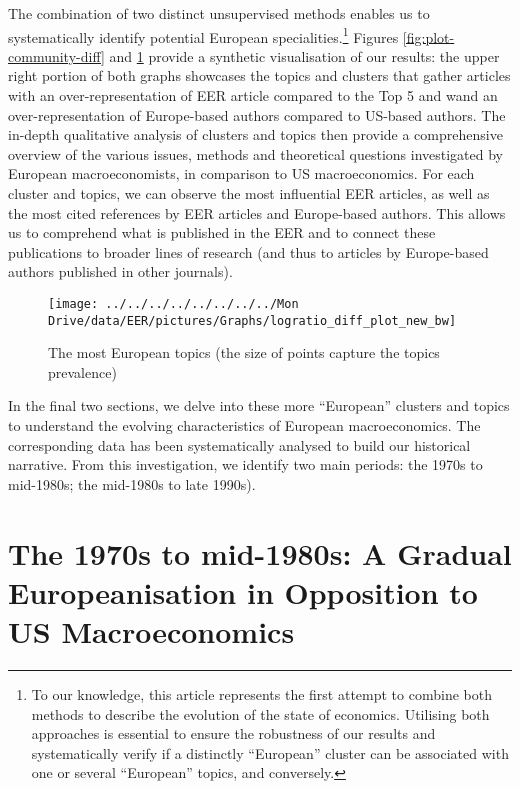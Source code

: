 \documentclass[
  12pt,
  onecolumn]{article}
\begin{document}
The combination of two distinct unsupervised methods enables us to systematically identify potential European specialities.\footnote{To our knowledge, this article represents the first attempt to combine both methods to describe the evolution of the state of economics. Utilising both approaches is essential to ensure the robustness of our results and systematically verify if a distinctly ``European'' cluster can be associated with one or several ``European'' topics, and conversely.} Figures \ref{fig:plot-community-diff} and \ref{fig:plot-topic-diff} provide a synthetic visualisation of our results: the upper right portion of both graphs showcases the topics and clusters that gather articles with an over-representation of EER article compared to the Top 5 and wand an over-representation of Europe-based authors compared to US-based authors. The in-depth qualitative analysis of clusters and topics then provide a comprehensive overview of the various issues, methods and theoretical questions investigated by European macroeconomists, in comparison to US macroeconomics. For each cluster and topics, we can observe the most influential EER articles, as well as the most cited references by EER articles and Europe-based authors. This allows us to comprehend what is published in the EER and to connect these publications to broader lines of research (and thus to articles by Europe-based authors published in other journals).

\begin{figure}[H]

{\centering \texttt{[image: ../../../../../../../../Mon Drive/data/EER/pictures/Graphs/logratio\_diff\_plot\_new\_bw]} 

}

\caption{The most European topics (the size of points capture the topics prevalence)}\label{fig:plot-topic-diff}
\end{figure}

\bigskip

In the final two sections, we delve into these more ``European'' clusters and topics to understand the evolving characteristics of European macroeconomics. The corresponding data has been systematically analysed to build our historical narrative. From this investigation, we identify two main periods: the 1970s to mid-1980s; the mid-1980s to late 1990s).

\hypertarget{the-1970s-to-mid-1980s-a-gradual-europeanisation-in-opposition-to-us-macroeconomics}{%
\section{The 1970s to mid-1980s: A Gradual Europeanisation in Opposition to US Macroeconomics}\label{the-1970s-to-mid-1980s-a-gradual-europeanisation-in-opposition-to-us-macroeconomics}}
\end{document}
